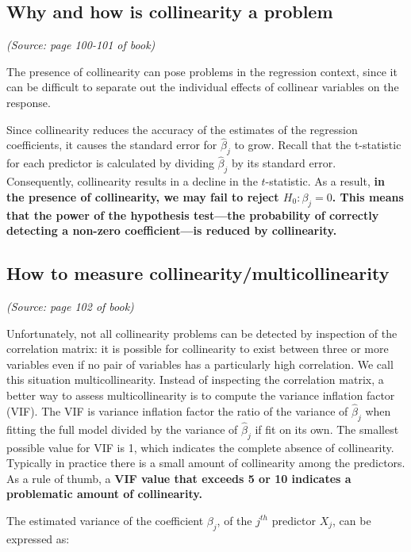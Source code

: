 \documentclass[
  letterpaper,
  DIV=11,
  numbers=noendperiod]{scrreprt}
\begin{document}
\subsection{Why and how is collinearity a
problem}\label{why-and-how-is-collinearity-a-problem}

\emph{(Source: page 100-101 of book)}

The presence of collinearity can pose problems in the regression
context, since it can be difficult to separate out the individual
effects of collinear variables on the response.

Since collinearity reduces the accuracy of the estimates of the
regression coefficients, it causes the standard error for
\(\hat \beta_j\) to grow. Recall that the t-statistic for each predictor
is calculated by dividing \(\hat \beta_j\) by its standard error.
Consequently, collinearity results in a decline in the \(t\)-statistic.
As a result, \textbf{in the presence of collinearity, we may fail to
reject \(H_0: \beta_j = 0\). This means that the power of the hypothesis
test---the probability of correctly detecting a non-zero
coefficient---is reduced by collinearity.}

\subsection{How to measure
collinearity/multicollinearity}\label{how-to-measure-collinearitymulticollinearity}

\emph{(Source: page 102 of book)}

Unfortunately, not all collinearity problems can be detected by
inspection of the correlation matrix: it is possible for collinearity to
exist between three or more variables even if no pair of variables has a
particularly high correlation. We call this situation multicollinearity.
Instead of inspecting the correlation matrix, a better way to assess
multicollinearity is to compute the variance inflation factor (VIF). The
VIF is variance inflation factor the ratio of the variance of
\(\hat \beta_j\) when fitting the full model divided by the variance of
\(\hat \beta_j\) if fit on its own. The smallest possible value for VIF
is 1, which indicates the complete absence of collinearity. Typically in
practice there is a small amount of collinearity among the predictors.
As a rule of thumb, a \textbf{VIF value that exceeds 5 or 10 indicates a
problematic amount of collinearity.}

The estimated variance of the coefficient \(\beta_j\), of the \(j^{th}\)
predictor \(X_j\), can be expressed as:
\end{document}
